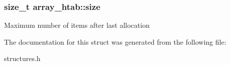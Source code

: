 \subsubsection[{\texorpdfstring{size}{size}}]{\setlength{\rightskip}{0pt plus 5cm}size\+\_\+t array\+\_\+htab\+::size}\hypertarget{structarray__htab_a63abd88a74d355292833e33b5a6b1a72}{}\label{structarray__htab_a63abd88a74d355292833e33b5a6b1a72}
Maximum number of items after last allocation 

The documentation for this struct was generated from the following file\+:\begin{DoxyCompactItemize}
\item 
structures.\+h\end{DoxyCompactItemize}
